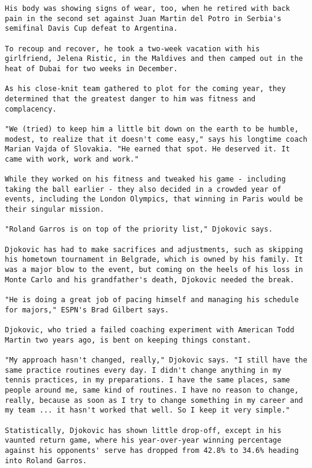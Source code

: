 \begin{lstlisting}
His body was showing signs of wear, too, when he retired with back pain in the second set against Juan Martin del Potro in Serbia's semifinal Davis Cup defeat to Argentina.

To recoup and recover, he took a two-week vacation with his girlfriend, Jelena Ristic, in the Maldives and then camped out in the heat of Dubai for two weeks in December.

As his close-knit team gathered to plot for the coming year, they determined that the greatest danger to him was fitness and complacency.

"We (tried) to keep him a little bit down on the earth to be humble, modest, to realize that it doesn't come easy," says his longtime coach Marian Vajda of Slovakia. "He earned that spot. He deserved it. It came with work, work and work."

While they worked on his fitness and tweaked his game - including taking the ball earlier - they also decided in a crowded year of events, including the London Olympics, that winning in Paris would be their singular mission.

"Roland Garros is on top of the priority list," Djokovic says.

Djokovic has had to make sacrifices and adjustments, such as skipping his hometown tournament in Belgrade, which is owned by his family. It was a major blow to the event, but coming on the heels of his loss in Monte Carlo and his grandfather's death, Djokovic needed the break.

"He is doing a great job of pacing himself and managing his schedule for majors," ESPN's Brad Gilbert says.

Djokovic, who tried a failed coaching experiment with American Todd Martin two years ago, is bent on keeping things constant.

"My approach hasn't changed, really," Djokovic says. "I still have the same practice routines every day. I didn't change anything in my tennis practices, in my preparations. I have the same places, same people around me, same kind of routines. I have no reason to change, really, because as soon as I try to change something in my career and my team ... it hasn't worked that well. So I keep it very simple."

Statistically, Djokovic has shown little drop-off, except in his vaunted return game, where his year-over-year winning percentage against his opponents' serve has dropped from 42.8% to 34.6% heading into Roland Garros.


\end{lstlisting}
